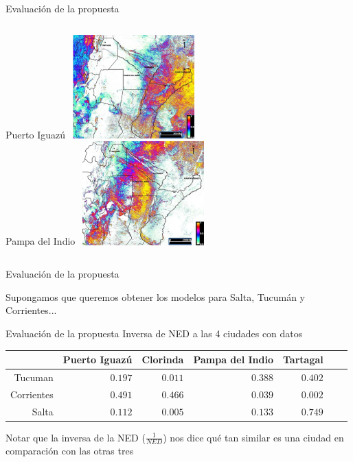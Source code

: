 \documentclass[10pt]{beamer}
\begin{document}
\begin{frame}{Evaluación de la propuesta}

    \begin{columns}[t]
    \centering
    Puerto Iguazú
    \includegraphics[width=5cm,height=4cm]{ned_iguazu}\\
    \centering
    Pampa del Indio
    \includegraphics[width=5cm,height=4cm]{ned_pampa}
    \end{columns}

\end{frame}


\begin{frame}{Evaluación de la propuesta}
  \fontsize{12}{12}\selectfont

  \begin{center}
    Supongamos que queremos obtener los modelos para Salta, Tucumán y Corrientes...
  \end{center}
\end{frame}



\begin{frame}{Evaluación de la propuesta}
\centering
Inversa de NED a las 4 ciudades con datos
\begin{tabular}{*7{r}}
\toprule
& Puerto Iguazú
& Clorinda
& Pampa del Indio
& Tartagal \\ \midrule
Tucuman
&$0.197$
&$0.011$
&$0.388$%
&$0.402$\\
Corrientes
&$0.491$
&$0.466$
&$0.039$
&$0.002$ \\
Salta
&$0.112$
&$0.005$
&$0.133$   %
&$0.749$ \\
\bottomrule
\end{tabular}
\pause
\begin{center}
  Notar que la inversa de la NED ($\frac{1}{NED}$) nos dice qué tan similar
  es una ciudad en comparación con las otras tres
\end{center}

\end{frame}
\end{document}
